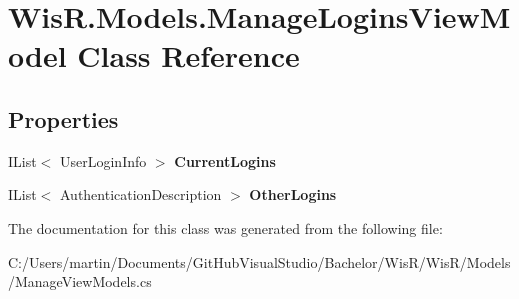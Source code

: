 \hypertarget{class_wis_r_1_1_models_1_1_manage_logins_view_model}{}\section{Wis\+R.\+Models.\+Manage\+Logins\+View\+Model Class Reference}
\label{class_wis_r_1_1_models_1_1_manage_logins_view_model}
\subsection*{Properties}
\begin{DoxyCompactItemize}
\item 
\hypertarget{class_wis_r_1_1_models_1_1_manage_logins_view_model_aec078130f74c58e47d296ee9e6f9cf63}{}I\+List$<$ User\+Login\+Info $>$ {\bfseries Current\+Logins}\label{class_wis_r_1_1_models_1_1_manage_logins_view_model_aec078130f74c58e47d296ee9e6f9cf63}

\item 
\hypertarget{class_wis_r_1_1_models_1_1_manage_logins_view_model_a4d9c7f3c2844141b3762d883c259d6ef}{}I\+List$<$ Authentication\+Description $>$ {\bfseries Other\+Logins}\label{class_wis_r_1_1_models_1_1_manage_logins_view_model_a4d9c7f3c2844141b3762d883c259d6ef}

\end{DoxyCompactItemize}


The documentation for this class was generated from the following file\+:\begin{DoxyCompactItemize}
\item 
C\+:/\+Users/martin/\+Documents/\+Git\+Hub\+Visual\+Studio/\+Bachelor/\+Wis\+R/\+Wis\+R/\+Models/Manage\+View\+Models.\+cs\end{DoxyCompactItemize}
